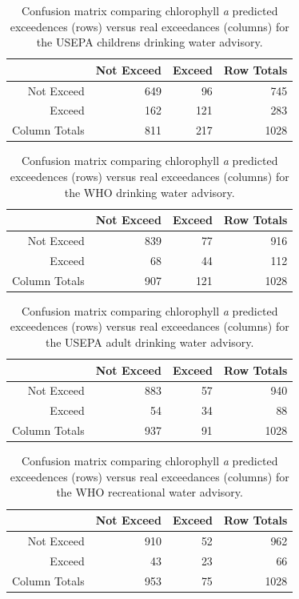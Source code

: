 \documentclass[10pt,a4paper,twocolumn]{article}
\begin{document}
\begin{table}[ht]
\caption{Confusion matrix comparing chlorophyll \textit{a} 
                     predicted exceedences (rows) versus real exceedances 
                     (columns) for the USEPA childrens drinking water advisory.} 
\label{tab:child_conmat_table}
\begin{tabular}{rrrr}
  \hline
 & Not Exceed & Exceed & Row Totals \\ 
  \hline
Not Exceed & 649 &  96 & 745 \\ 
  Exceed & 162 & 121 & 283 \\ 
  Column Totals & 811 & 217 & 1028 \\ 
   \hline
\end{tabular}
\end{table}

\begin{table}[ht]
\caption{Confusion matrix comparing chlorophyll \textit{a} 
                     predicted exceedences (rows) versus real exceedances 
                     (columns) for the WHO drinking water advisory.} 
\label{tab:who_drink_conmat_table}
\begin{tabular}{rrrr}
  \hline
 & Not Exceed & Exceed & Row Totals \\ 
  \hline
Not Exceed & 839 &  77 & 916 \\ 
  Exceed &  68 &  44 & 112 \\ 
  Column Totals & 907 & 121 & 1028 \\ 
   \hline
\end{tabular}
\end{table}

\begin{table}[ht]
\caption{Confusion matrix comparing chlorophyll \textit{a} 
                     predicted exceedences (rows) versus real exceedances 
                     (columns) for the USEPA adult drinking water advisory.} 
\label{tab:adult_conmat_table}
\begin{tabular}{rrrr}
  \hline
 & Not Exceed & Exceed & Row Totals \\ 
  \hline
Not Exceed & 883 &  57 & 940 \\ 
  Exceed &  54 &  34 &  88 \\ 
  Column Totals & 937 &  91 & 1028 \\ 
   \hline
\end{tabular}
\end{table}

\begin{table}[ht]
\caption{Confusion matrix comparing chlorophyll \textit{a} 
                     predicted exceedences (rows) versus real exceedances 
                     (columns) for the WHO recreational water advisory.} 
\label{tab:who_rec_conmat_table}
\begin{tabular}{rrrr}
  \hline
 & Not Exceed & Exceed & Row Totals \\ 
  \hline
Not Exceed & 910 &  52 & 962 \\ 
  Exceed &  43 &  23 &  66 \\ 
  Column Totals & 953 &  75 & 1028 \\ 
   \hline
\end{tabular}
\end{table}
\end{document}
